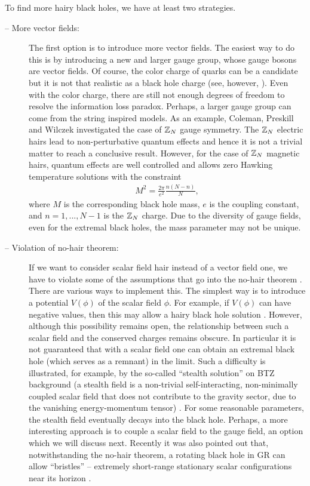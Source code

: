 \documentclass[12pt]{article}
\newcommand{\2}{$^2$}
\newcommand{\3}{$^3$}
\newcommand{\4}{$_4$}
\newcommand{\5}{$_5$}
\begin{document}
To find more hairy black holes, we have at least two strategies.
\begin{description}
\item[-- More vector fields:] The first option is to introduce more vector fields. The easiest way to do this is by introducing a new and larger gauge group, whose gauge bosons are vector fields. Of course, the color charge of quarks can be a candidate but it is not that realistic as a black hole charge (see, however, \cite{0806.4605}). 
Even with the color charge, there are still not enough degrees of freedom to resolve the information loss paradox.
Perhaps, a larger gauge group can come from the string inspired models. As an example, Coleman, Preskill and Wilczek \cite{Coleman:1991sj1, Coleman:1991sj2} investigated the case of $\Bbb{Z}_{N}$ gauge symmetry. The $\Bbb{Z}_{N}$ electric hairs lead to non-perturbative quantum effects and hence it is not a trivial matter to reach a conclusive result. However, for the case of $\Bbb{Z}_{N}$ magnetic hairs, quantum effects are well controlled and allows zero Hawking temperature solutions with the constraint
\begin{eqnarray}
M^{2} = \frac{2\pi}{e^{2}} \frac{n(N-n)}{N},
\end{eqnarray}
where $M$ is the corresponding black hole mass, $e$ is the coupling constant, and $n = 1, ..., N-1$ is the $\Bbb{Z}_{N}$ charge. Due to the diversity of gauge fields, even for the extremal black holes, the mass parameter may not be unique.

\item[-- Violation of no-hair theorem:] If we want to consider scalar field hair instead of a vector field one, we have to violate some of the assumptions that go into the no-hair theorem \cite{Sudarsky:1995zg}. There are various ways to implement this. The simplest way is to introduce a potential $V(\phi)$ of the scalar field $\phi$. For example, if $V(\phi)$ can have negative values, then this may allow a hairy black hole solution \cite{Anabalon:2012ih}. However, although this possibility remains open, the relationship between such a scalar field and the conserved charges remains obscure. In particular it is not guaranteed that with a scalar field one can obtain an extremal black hole (which serves as a remnant) in the limit. 
Such a difficulty is illustrated, for example, by the so-called ``stealth solution'' on BTZ background (a stealth field is a non-trivial self-interacting, non-minimally coupled scalar field that does not contribute to the gravity sector, due to the vanishing energy-momentum tensor) \cite{stealth}. For some reasonable parameters, the stealth field eventually decays into the black hole.
Perhaps, a more interesting approach is to couple a scalar field to the gauge field, an option which we will discuss next. Recently it was also pointed out that, notwithstanding the no-hair theorem, a rotating black hole in GR can allow ``bristles''  -- extremely short-range stationary scalar configurations near its horizon \cite{1411.2609}.
\end{description}
\end{document}
